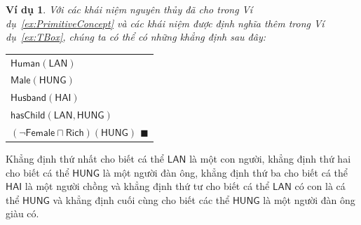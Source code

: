 \documentclass[12pt,a4paper]{report}
\newtheorem{Example}{Ví dụ}[chapter]
\newcommand{\myend}{\mbox{}\hfill\mbox{{\scriptsize$\!\blacksquare$}}}
\newcommand{\mand}{\sqcap}
\begin{document}
\begin{Example}\label{ex:ABox}
  Với các khái niệm nguyên thủy đã cho trong Ví dụ~\ref{ex:PrimitiveConcept} và các khái niệm được định nghĩa thêm trong Ví dụ~\ref{ex:TBox}, chúng ta có thể có những khẳng định sau đây:

  \begin{tabular}{l}
    $\mathsf{Human(LAN)}$\\
    $\mathsf{Male(HUNG)}$\\
    $\mathsf{Husband(HAI)}$\\
    $\mathsf{hasChild(LAN, HUNG)}$\\
    $\mathsf{(\neg Female \mand Rich)(HUNG)}$\hspace{54.5ex} \myend
  \end{tabular}
\end{Example}

Khẳng định thứ nhất cho biết cá thể $\mathsf{LAN}$ là một con người, khẳng định thứ hai cho biết cá thể $\mathsf{HUNG}$ là một người đàn ông, khẳng định thứ ba cho biết cá thể $\mathsf{HAI}$ là một người chồng và khẳng định thứ tư cho biết cá thể $\mathsf{LAN}$ có con là cá thể $\mathsf{HUNG}$ và khẳng định cuối cùng cho biết các thể $\mathsf{HUNG}$ là một người đàn ông giàu có.
\end{document}
